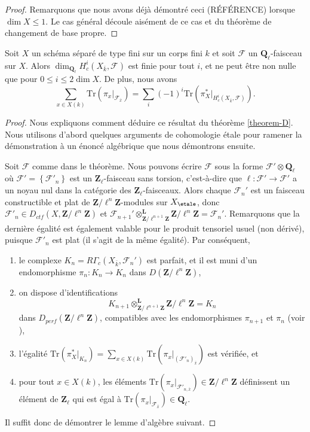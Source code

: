 \begin{proof}
Remarquons que nous avons déjà démontré ceci (RÉFÉRENCE) lorsque $\dim X \leq 1$. Le
cas général découle aisément de ce cas et du théorème de changement de base
propre.
\end{proof}

\begin{theorem}
\label{theorem-C}
Soit $X$ un schéma séparé de type fini sur un corps fini $k$ et soit
$\mathcal{F}$ un $\mathbf{Q}_\ell$-faisceau sur $X$. Alors
$\dim_{\mathbf{Q}_\ell}H_c^i(X_{\bar k}, \mathcal{F})$ est finie pour tout $i$,
et ne peut être non nulle que pour $0\leq i \leq 2 \dim X$. De plus, nous avons
$$
\sum_{x\in X(k)} \text{Tr}\left(\pi_x |_{\mathcal{F}_{\bar x}}\right) =
\sum_i (-1)^i\text{Tr}\left(\pi_X^* |_{H_c^i(X_{\bar k}, \mathcal{F})}\right).
$$
\end{theorem}

\begin{proof}
Nous expliquons comment déduire ce résultat du théorème \ref{theorem-D}.
Nous utilisons d'abord quelques arguments de cohomologie \'etale pour ramener la démonstration
à un énoncé algébrique que nous démontrons ensuite.

\medskip\noindent
Soit $\mathcal{F}$ comme dans le théorème. Nous pouvons écrire
$\mathcal{F}$ sous la forme
$\mathcal{F}'\otimes \mathbf{Q}_\ell$ où $\mathcal{F}' =
\left\{\mathcal{F}'_n\right\}$ est un $\mathbf{Z}_\ell$-faisceau sans torsion,
c'est-à-dire que $\ell : \mathcal{F}'\to \mathcal{F}'$ a un noyau nul dans la
catégorie des $\mathbf{Z}_\ell$-faisceaux. Alors chaque $\mathcal{F}_n'$ est un
faisceau constructible et plat de $\mathbf{Z}/\ell^n\mathbf{Z}$-modules sur $X_\etale$, donc
$\mathcal{F}'_n \in D_{ctf}(X, \mathbf{Z}/\ell^n\mathbf{Z})$ et
$\mathcal{F}_{n+1}'
\otimes^{\mathbf{L}}_{\mathbf{Z}/\ell^{n+1}\mathbf{Z}}
\mathbf{Z}/\ell^n\mathbf{Z} = \mathcal{F}_n'$.
Remarquons que la dernière égalité est également valable
pour le produit tensoriel usuel (non dérivé), puisque $\mathcal{F}'_n$ est plat
(il s'agit de la même égalité). Par conséquent,
\begin{enumerate}
\item
le complexe $K_n = R\Gamma_c\left(X_{\bar k}, \mathcal{F}_n'\right)$ est parfait,
et il est muni d'un endomorphisme $\pi_n : K_n\to K_n$ dans
$D(\mathbf{Z}/\ell^n\mathbf{Z})$,
\item
on dispose d'identifications
$$
K_{n+1}
\otimes^{\mathbf{L}}_{\mathbf{Z}/\ell^{n+1}\mathbf{Z}}
\mathbf{Z}/\ell^n\mathbf{Z}
=
K_n
$$
dans $D_{perf}(\mathbf{Z}/\ell^n\mathbf{Z})$, compatibles avec les endomorphismes
$\pi_{n+1}$ et $\pi_n$ (voir \cite[Rapport 4.12]{SGA4.5}),
\item
l'égalité $\text{Tr}\left(\pi_X^* |_{K_n}\right) =
\sum_{x\in X(k)} \text{Tr}\left(\pi_x |_{(\mathcal{F}'_n)_{\bar x}}\right)$
est vérifiée, et
\item
pour tout $x\in X(k)$, les éléments
$\text{Tr}(\pi_x |_{\mathcal{F}'_{n, \bar x}}) \in \mathbf{Z}/\ell^n\mathbf{Z}$
définissent un élément de
$\mathbf{Z}_\ell$ qui est égal à
$\text{Tr}(\pi_x |_{\mathcal{F}_{\bar x}}) \in \mathbf{Q}_\ell$.
\end{enumerate}
Il suffit donc de démontrer le lemme d'algèbre suivant.
\end{proof}

